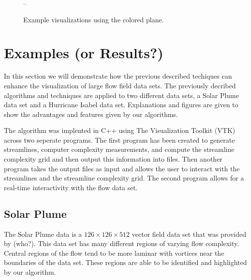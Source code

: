 \documentclass[journal]{vgtc}                %
\begin{document}
\begin{figure}[t]
	\centering--
		\begin{minipage}{0.47\linewidth}
			\centering \small
		\end{minipage}
		\begin{minipage}{0.47\linewidth}
			\centering \small
		\end{minipage}
	\caption{Example visualizations using the colored plane.}
	\label{fig:iso}
\end{figure}

\section{Examples (or Results?)} \label{sec:examples}

In this section we will demonstrate how the previous described techiques can enhance the visualization of large flow field data sets.
The previously decribed algorithms and techniques are applied to two different data sets, a Solar Plume data set and a Hurricane Isabel data set.
Explanations and figures are given to show the advantages and features given by our algorithms.

The algorithm was implented in C++ using The Visualization Toolkit (VTK) across two seperate programs.
The first program has been created to generate streamlines, computer complexity measurements, and compute the streamline complexity grid and then output this information into files.
Then another program takes the output files as input and allows the user to interact with the streamlines and the streamline complexity grid.
The second program allows for a real-time interactivity with the flow data set.

\subsection{Solar Plume}

The Solar Plume data is a $126 \times 126 \times 512$ vector field data set that was provided by (who?).
This data set has many different regions of varying flow complexity.
Central regions of the flow tend to be more laminar with vortices near the boundaries of the data set.
These regions are able to be identified and highlighted by our algorithm.
\end{document}
